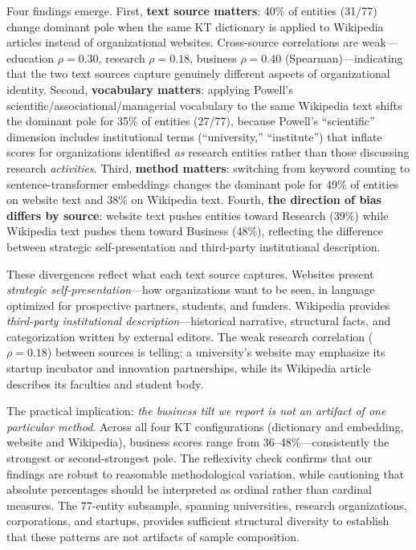 \documentclass[../main.tex]{subfiles}
\begin{document}
Four findings emerge. First, \textbf{text source matters}: 40\% of entities (31/77)
change dominant pole when the same KT dictionary is applied to Wikipedia articles
instead of organizational websites. Cross-source correlations are weak---education
$\rho = 0.30$, research $\rho = 0.18$, business $\rho = 0.40$ (Spearman)---indicating
that the two text sources capture genuinely different aspects of organizational identity.
Second, \textbf{vocabulary matters}: applying Powell's scientific/associational/managerial
vocabulary to the same Wikipedia text shifts the dominant pole for 35\% of entities
(27/77), because Powell's ``scientific'' dimension includes institutional terms
(``university,'' ``institute'') that inflate scores for organizations identified
\textit{as} research entities rather than those discussing research
\textit{activities}. Third, \textbf{method matters}: switching from keyword counting to
sentence-transformer embeddings changes the dominant pole for 49\% of entities on
website text and 38\% on Wikipedia text. Fourth, \textbf{the direction of bias
differs by source}: website text pushes entities toward Research (39\%) while
Wikipedia text pushes them toward Business (48\%), reflecting the difference between
strategic self-presentation and third-party institutional description.

These divergences reflect what each text source captures. Websites present
\textit{strategic self-presentation}---how organizations want to be seen, in
language optimized for prospective partners, students, and funders. Wikipedia
provides \textit{third-party institutional description}---historical narrative,
structural facts, and categorization written by external
editors. The weak
research correlation ($\rho = 0.18$) between sources is telling: a university's
website may emphasize its startup incubator and innovation partnerships, while
its Wikipedia article describes its faculties and student body.

The practical implication: \textit{the business tilt we report is not an artifact
of one particular method}. Across all four KT configurations (dictionary and
embedding, website and Wikipedia), business scores range from 36--48\%---consistently
the strongest or second-strongest pole. The reflexivity check confirms that our
findings are robust to reasonable methodological variation, while cautioning that
absolute percentages should be interpreted as ordinal rather than cardinal measures.
The 77-entity subsample, spanning universities, research organizations, corporations,
and startups, provides sufficient structural diversity to establish that these
patterns are not artifacts of sample composition.
\end{document}
